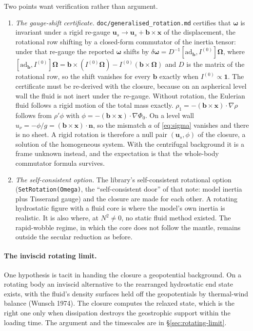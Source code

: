 \documentclass[11pt]{article}
\theoremstyle{definition}
\theoremstyle{remark}
\newcommand{\bu}{\mathbf{u}}
\newcommand{\bn}{\mathbf{n}}
\newcommand{\bx}{\mathbf{x}}
\newcommand{\bOmega}{\boldsymbol{\Omega}}
\newcommand{\bomega}{\boldsymbol{\omega}}
\newcommand{\code}[1]{\texttt{#1}}
\begin{document}
Two points want verification rather than argument.
\begin{enumerate}
\item \emph{The gauge-shift certificate.}
  \code{doc/generalised\_rotation.md} certifies that $\bomega$ is
  invariant under a rigid re-gauge $\bu_s \to \bu_s + \mathbf b\times
  \bx$ of the displacement, the rotational row shifting by a
  closed-form commutator of the inertia tensor: under that re-gauge
  the reported $\bomega$ shifts by $\delta\bomega =
  D^{-1}[\mathrm{ad}_{\mathbf b}, I^{(0)}]\bOmega$, where
  $[\mathrm{ad}_{\mathbf b}, I^{(0)}]\bOmega = \mathbf
  b\times(I^{(0)}\bOmega) - I^{(0)}(\mathbf b\times\bOmega)$ and $D$
  is the matrix of the rotational row, so the shift vanishes for every
  $\mathbf b$ exactly when $I^{(0)} \propto \mathbf 1$. The
  certificate must be re-derived with the closure,
  because on an aspherical level wall the fluid is not inert under the
  re-gauge. Without rotation, the Eulerian fluid follows a rigid
  motion of the total mass exactly. $\rho_1 = -(\mathbf
  b\times\bx)\cdot\nabla\rho$ follows from $\rho'\phi$ with $\phi
  = -(\mathbf b\times\bx)\cdot\nabla\Phi_0$. On a level wall $u_\nu =
  -\phi/g = (\mathbf b\times\bx)\cdot\bn$, so the mismatch $a$ of \eqref{eq:sigma} vanishes and there is no
  sheet. A rigid rotation is therefore a null pair $(\bu_s, \phi)$ of
  the closure, a solution of the homogeneous system. With the
  centrifugal background it is a frame unknown instead, and the
  expectation is that the whole-body commutator formula survives.
\item \emph{The self-consistent option.} The library's self-consistent
  rotational option (\code{SetRotation(Omega)}, the ``self-consistent
  door'' of that note: model inertia plus Tisserand gauge) and the
  closure are made for each other. A rotating hydrostatic figure with
  a fluid core is where the model's own inertia is realistic. It is
  also where, at $N^2 \ne 0$, no static fluid method existed. The
  rapid-wobble regime, in which the core does not follow the mantle,
  remains outside the secular reduction as before.
\end{enumerate}

\paragraph{The inviscid rotating limit.} One hypothesis is tacit in
handing the closure a geopotential background. On a rotating body an
inviscid alternative to the rearranged hydrostatic end state exists,
with the fluid's density surfaces held off the geopotentials by
thermal-wind balance (Wunsch 1974). The closure computes the relaxed
state, which is the right one only when dissipation destroys the
geostrophic support within the loading time. The argument and the
timescales are in \S\ref{sec:rotating-limit}.
\end{document}

